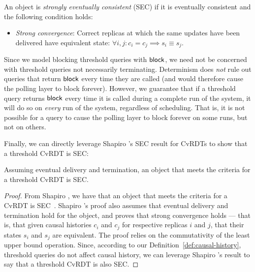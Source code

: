\begin{definition}
  \label{def:strong-eventual-consistency}
  An object is \emph{strongly eventually consistent} (SEC) if it is
  eventually consistent and the following condition holds:
  \begin{itemize}
  \item \emph{Strong convergence}: Correct replicas at which the same
    updates have been delivered have equivalent state:
    $\forall i, j : c_i = c_j \implies s_i \equiv s_j$.
  \end{itemize}
\end{definition}
Since we model blocking threshold queries with $\textsf{block}$, we need not
be concerned with threshold queries not necessarily terminating.
Determinism does \emph{not} rule out queries that return $\textsf{block}$
every time they are called (and would therefore cause the polling
layer to block forever).  However, we guarantee that if a threshold
query returns $\textsf{block}$ every time it is called during a complete run
of the system, it will do so on \emph{every} run of the system,
regardless of scheduling.  That is, it is not possible for a query to
cause the polling layer to block forever on some runs, but not on
others.

Finally, we can directly leverage Shapiro \etal's SEC result for
CvRDTs to show that a threshold CvRDT is SEC:
\begin{thm}
  \label{thm:strong-eventual-consistency-of-threshold-cvrdts}
  Assuming eventual delivery and termination, an object that meets
  the criteria for a threshold CvRDT is SEC.
\end{thm}
\begin{proof}
From Shapiro \etal, we have that an object that meets the criteria for
a CvRDT is SEC~\cite{crdts}.  Shapiro \etal's proof also assumes that
eventual delivery and termination hold for the object, and proves that
strong convergence holds --- that is, that given causal histories
$c_i$ and $c_j$ for respective replicas $i$ and $j$, that their states
$s_i$ and $s_j$ are equivalent.  The proof relies on the commutativity
of the least upper bound operation.  Since, according to our
Definition~\ref{def:causal-history}, threshold queries do not affect
causal history, we can leverage Shapiro \etal's result to say that a
threshold CvRDT is also SEC.
\end{proof}
